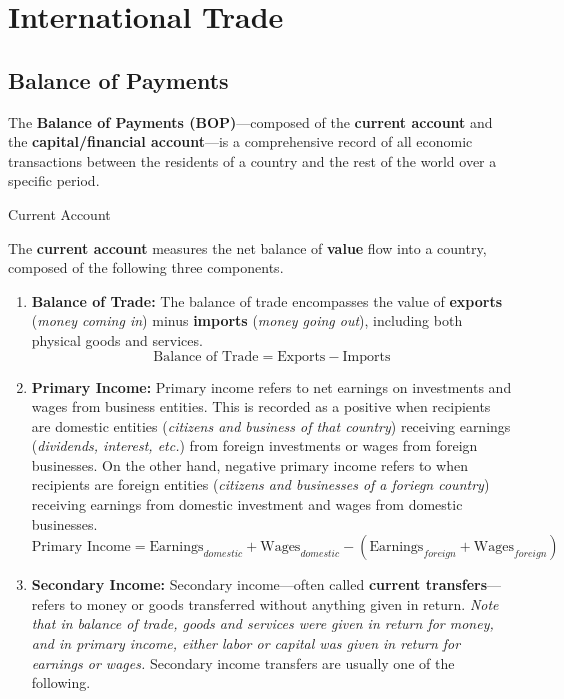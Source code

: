 \documentclass[10pt]{article}
\begin{document}
\section{International Trade}

  \subsection{Balance of Payments}

    The \textbf{Balance of Payments (BOP)}---composed of the \textbf{current account} and the \textbf{capital/financial account}---is a comprehensive record of all economic transactions between the residents of a country and the rest of the world over a specific period.

    \begin{core}{Current Account}

      The \textbf{current account} measures the net balance of \textbf{value} flow into a country, composed of the following three components.

      \begin{enumerate}

        \item \textbf{Balance of Trade:} The balance of trade encompasses the value of \textbf{exports} (\textit{money coming in}) minus \textbf{imports} (\textit{money going out}), including both physical goods and services.
        \[
          \text{Balance of Trade} = \text{Exports} - \text{Imports}
        \]

        \item \textbf{Primary Income:} Primary income refers to net earnings on investments and wages from business entities. This is recorded as a positive when recipients are domestic entities (\textit{citizens and business of that country}) receiving earnings (\textit{dividends, interest, etc.}) from foreign investments or wages from foreign businesses. On the other hand, negative primary income refers to when recipients are foreign entities (\textit{citizens and businesses of a foriegn country}) receiving earnings from domestic investment and wages from domestic businesses.
        \[
          \text{Primary Income} = \text{Earnings}_{domestic} + \text{Wages}_{domestic} - (\text{Earnings}_{foreign} + \text{Wages}_{foreign})
        \]

        \item \textbf{Secondary Income:} Secondary income---often called \textbf{current transfers}---refers to money or goods transferred without anything given in return. \textit{Note that in balance of trade, goods and services were given in return for money, and in primary income, either labor or capital was given in return for earnings or wages.} Secondary income transfers are usually one of the following.


\end{enumerate}
\end{core}
\end{document}
